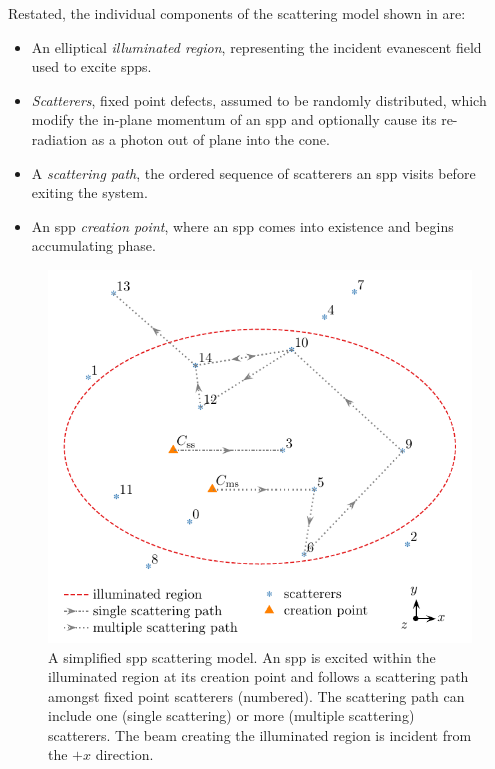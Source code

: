 Restated, the individual components of the scattering model shown in
 are:
\begin{itemize}
  \item An elliptical \textit{illuminated region}, representing the incident
        evanescent field used to excite \glspl{spp}.
  \item \textit{Scatterers}, fixed point defects, assumed to be randomly
        distributed, which modify the in-plane momentum of an \gls{spp} and
        optionally cause its re-radiation as a photon out of plane into the cone.
  \item A \textit{scattering path}, the ordered sequence of
        scatterers an \gls{spp} visits before exiting the system.
  \item An \gls{spp} \textit{creation point}, where an \gls{spp} comes into existence and
        begins accumulating phase.
\end{itemize}
\begin{figure}[ht]
  \centering
  \includegraphics[keepaspectratio]{scatteringmicro/figures/montecarlogeosimple.pdf}
  \caption{A simplified \gls{spp} scattering model.  An \gls{spp} is excited within the
    illuminated region at its creation point and follows a scattering path
    amongst fixed point scatterers (numbered).  The scattering path can
    include one (single scattering) or more (multiple scattering)
    scatterers.  The beam creating the illuminated region is incident from
    the ${+}x$ direction.}
  \label{fig:plasmongeosimple}
\end{figure}

